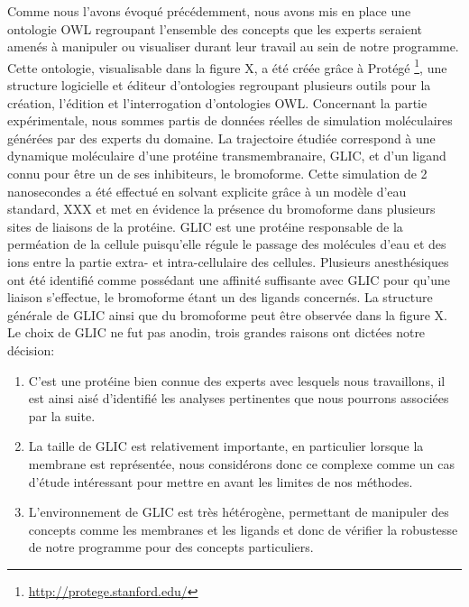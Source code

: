 Comme nous l'avons évoqué précédemment, nous avons mis en place une ontologie OWL regroupant l'ensemble des concepts que les experts seraient amenés à manipuler ou visualiser durant leur travail au sein de notre programme. Cette ontologie, visualisable dans la figure X, a été créée grâce à Protégé \footnote{\url{http://protege.stanford.edu/}}, une structure logicielle et éditeur d'ontologies regroupant plusieurs outils pour la création, l'édition et l'interrogation d'ontologies OWL.
Concernant la partie expérimentale, nous sommes partis de données réelles de simulation moléculaires générées par des experts du domaine. La trajectoire étudiée correspond à une dynamique moléculaire d'une protéine transmembranaire, GLIC, et d'un ligand connu pour être un de ses inhibiteurs, le bromoforme. Cette simulation de 2 nanosecondes a été effectué en solvant explicite grâce à un modèle d'eau standard, XXX et met en évidence la présence du bromoforme dans plusieurs sites de liaisons de la protéine. GLIC est une protéine responsable de la perméation de la cellule puisqu'elle régule le passage des molécules d'eau et des ions entre la partie extra- et intra-cellulaire des cellules. Plusieurs anesthésiques ont été identifié comme possédant une affinité suffisante avec GLIC pour qu'une liaison s'effectue, le bromoforme étant un des ligands concernés. La structure générale de GLIC ainsi que du bromoforme peut être observée dans la figure X. Le choix de GLIC ne fut pas anodin, trois grandes raisons ont dictées notre décision:
\begin{enumerate}
	\item C'est une protéine bien connue des experts avec lesquels nous travaillons, il est ainsi aisé d'identifié les analyses pertinentes que nous pourrons associées par la suite.
	\item La taille de GLIC est relativement importante, en particulier lorsque la membrane est représentée, nous considérons donc ce complexe comme un cas d'étude intéressant pour mettre en avant les limites de nos méthodes.
	\item L'environnement de GLIC est très hétérogène, permettant de manipuler des concepts comme les membranes et les ligands et donc de vérifier la robustesse de notre programme pour des concepts particuliers.
\end{enumerate}

